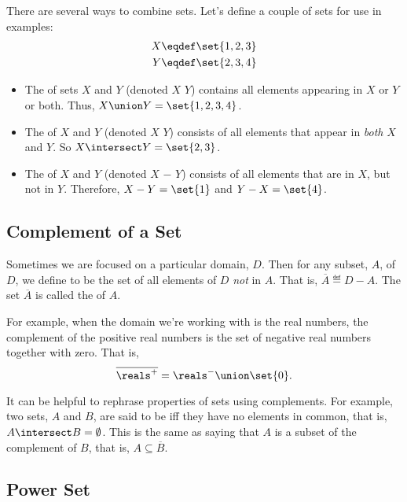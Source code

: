 There are several ways to combine sets.  Let's define a couple of sets for
use in examples:
\begin{align*}
X & \eqdef \set{1, 2, 3} \\
Y & \eqdef \set{2, 3, 4}
\end{align*}

\begin{itemize}

\item The  of sets $X$ and $Y$ (denoted $X$ \term{$\union$} $Y$)
contains all elements appearing in $X$ or $Y$ or both.  Thus, $X \union
Y = \set{1, 2, 3, 4}$.

\item The  of $X$ and $Y$ (denoted $X$
  \term{$\intersect$} $Y$) consists of all elements that appear in
  \textit{both} $X$ and $Y$.  So $X \intersect Y = \set{2, 3}$.

\item The  of $X$ and $Y$ (denoted $X$ $-$ $Y$) consists of all elements that are in $X$, but not in $Y$.
  Therefore, $X - Y = \set{1}$ and $Y - X = \set{4}$.

\end{itemize}

\subsection{Complement of a Set}

Sometimes we are focused on a particular domain, $D$.  Then for any
subset, $A$, of $D$, we define  to be the set of all
elements of $D$ \textit{not} in $A$.  That is, $\overline{A} \eqdef D-A$.
The set $\overline{A}$ is called the  of $A$.

For example, when the domain we're working with is the real numbers,
the complement of the positive real numbers is the set of negative real
numbers together with zero.  That is,
\[
\overline{\reals^+} = \reals^- \union \set{0}.
\]

It can be helpful to rephrase properties of sets using complements.  For
example, two sets, $A$ and $B$, are said to be  iff they
have no elements in common, that is, $A \intersect B = \emptyset$.  This
is the same as saying that $A$ is a subset of the complement of $B$, that
is, $A \subseteq \overline{B}$.

\subsection{Power Set}

